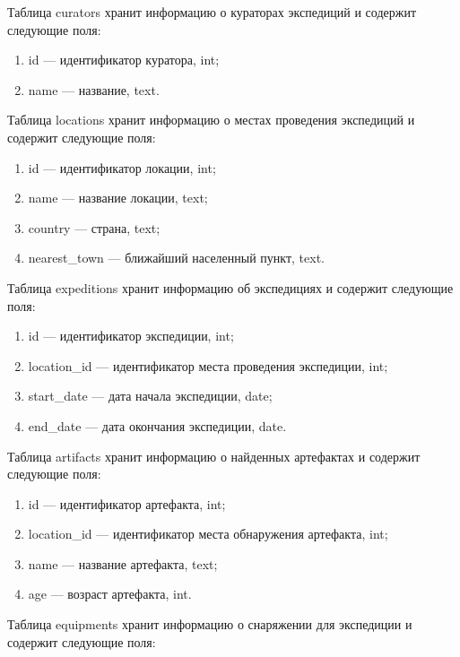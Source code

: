 Таблица curators хранит информацию о кураторах экспедиций и содержит следующие поля:

\begin{enumerate}[left=0.49cm, label=\arabic*.]
        \item id --- идентификатор куратора, int;
	\item name --- название, text.
\end{enumerate}

Таблица locations хранит информацию о местах проведения экспедиций и содержит следующие поля:

\begin{enumerate}[left=0.49cm, label=\arabic*.]
        \item id --- идентификатор локации, int;
	\item name --- название локации, text;
	\item country --- страна, text;
        \item nearest\_town --- ближайший населенный пункт, text.
\end{enumerate}

Таблица expeditions хранит информацию об экспедициях и содержит следующие поля:

\begin{enumerate}[left=0.49cm, label=\arabic*.]
        \item id --- идентификатор экспедиции, int;
	\item location\_id --- идентификатор места проведения экспедиции, int;
	\item start\_date --- дата начала экспедиции, date;
        \item end\_date --- дата окончания экспедиции, date.
\end{enumerate}

Таблица artifacts хранит информацию о найденных артефактах и содержит следующие поля:

\begin{enumerate}[left=0.49cm, label=\arabic*.]
        \item id --- идентификатор артефакта, int;
	\item location\_id --- идентификатор места обнаружения артефакта, int;
	\item name --- название артефакта, text;
        \item age --- возраст артефакта, int.
\end{enumerate}

Таблица equipments хранит информацию о снаряжении для экспедиции и содержит следующие поля:

